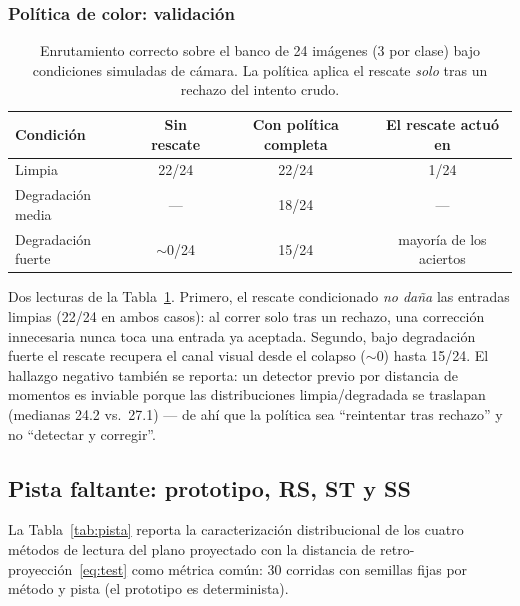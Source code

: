 \subsubsection*{Política de color: validación}

\begin{table}[H]
\centering
\caption{Enrutamiento correcto sobre el banco de 24 imágenes (3 por clase) bajo
condiciones simuladas de cámara. La política aplica el rescate
\emph{solo} tras un rechazo del intento crudo.}
\label{tab:colorfix}
\begin{tabular}{lccc}
\toprule
Condición & Sin rescate & Con política completa & El rescate actuó en \\
\midrule
Limpia             & 22/24 & 22/24 & 1/24 \\
Degradación media  & ---   & 18/24 & --- \\
Degradación fuerte & $\sim$0/24 & 15/24 & mayoría de los aciertos \\
\bottomrule
\end{tabular}
\end{table}

Dos lecturas de la Tabla~\ref{tab:colorfix}.
Primero, el rescate condicionado \emph{no daña} las entradas limpias (22/24 en ambos
casos): al correr solo tras un rechazo, una corrección innecesaria nunca toca una
entrada ya aceptada.
Segundo, bajo degradación fuerte el rescate recupera el canal visual desde el colapso
($\sim$0) hasta 15/24.
El hallazgo negativo también se reporta: un detector previo por distancia de momentos
es inviable porque las distribuciones limpia/degradada se traslapan (medianas 24.2
vs.\ 27.1) --- de ahí que la política sea ``reintentar tras rechazo'' y no
``detectar y corregir''.

\subsection{Pista faltante: prototipo, RS, ST y SS}
\label{sec:res_pista}

La Tabla~\ref{tab:pista} reporta la caracterización distribucional de los cuatro
métodos de lectura del plano proyectado con la distancia de
retro-proyección~\eqref{eq:test} como métrica común: 30 corridas con semillas fijas
por método y pista (el prototipo es determinista).

